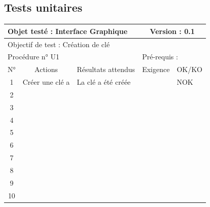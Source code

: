 \documentclass{../res/univ-projet}
\begin{document}
\subsection{Tests unitaires}

\begin{center}
    \begin{tabular}{|c|p{5cm}|p{5cm}|p{1.5cm}|p{1.5cm}|}
      \hline
      \multicolumn{3}{|l|}{Objet testé : Interface Graphique} & \multicolumn{2}{c|}{Version : 0.1}\\ \hline
      \multicolumn{5}{|l|}{Objectif de test : Création de clé}\\ \hline
      \multicolumn{3}{|l|}{Procédure n° U1} & \multicolumn{2}{p{3cm}|}{Pré-requis : }\\ \hline
      \multicolumn{1}{|c|}{N°} & \multicolumn{1}{c|}{Actions} & \multicolumn{1}{c|}{Résultats attendus} & 
      \multicolumn{1}{c|}{Exigence} & \multicolumn{1}{c|}{OK/KO}\\ \hline
      1 & Créer une clé a & La clé a été créée &  & NOK \\
      2 &  &  &  & \\
      3 &  &  &  & \\ 
      4 &  &  &  & \\
      5 &  &  &  & \\
      6 &  &  &  & \\
      7 &  &  &  & \\
      8 &  &  &  & \\
      9 &  &  &  & \\
      10 &  &  &  &\\ 
	\hline
    \end{tabular}
    \vskip 2.2cm



\end{center}
\end{document}
